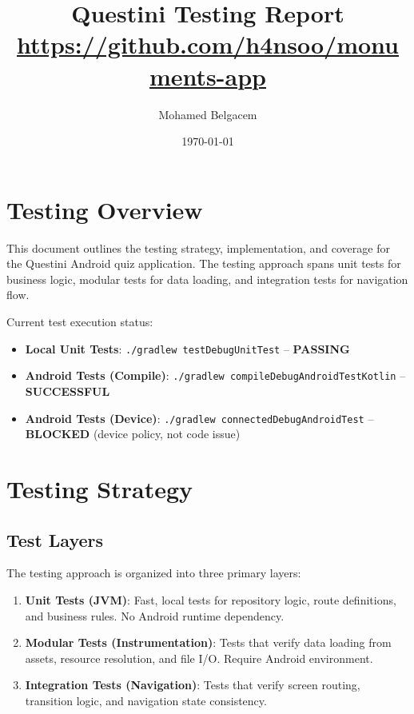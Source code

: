 \documentclass[12pt,a4paper]{article}
\title{Questini Testing Report \\
\small\url{https://github.com/h4nsoo/monuments-app}}
\author{Mohamed Belgacem}
\date{\today}
\begin{document}
\maketitle
\onehalfspacing

\tableofcontents
\newpage

\section{Testing Overview}

This document outlines the testing strategy, implementation, and coverage for the Questini Android quiz application. The testing approach spans unit tests for business logic, modular tests for data loading, and integration tests for navigation flow.

Current test execution status:
\begin{itemize}
    \item \textbf{Local Unit Tests}: \texttt{./gradlew testDebugUnitTest} -- \textbf{PASSING}
    \item \textbf{Android Tests (Compile)}: \texttt{./gradlew compileDebugAndroidTestKotlin} -- \textbf{SUCCESSFUL}
    \item \textbf{Android Tests (Device)}: \texttt{./gradlew connectedDebugAndroidTest} -- \textbf{BLOCKED} (device policy, not code issue)
\end{itemize}

\section{Testing Strategy}

\subsection{Test Layers}

The testing approach is organized into three primary layers:

\begin{enumerate}
    \item \textbf{Unit Tests (JVM)}: Fast, local tests for repository logic, route definitions, and business rules. No Android runtime dependency.
    \item \textbf{Modular Tests (Instrumentation)}: Tests that verify data loading from assets, resource resolution, and file I/O. Require Android environment.
    \item \textbf{Integration Tests (Navigation)}: Tests that verify screen routing, transition logic, and navigation state consistency.
\end{enumerate}
\end{document}
